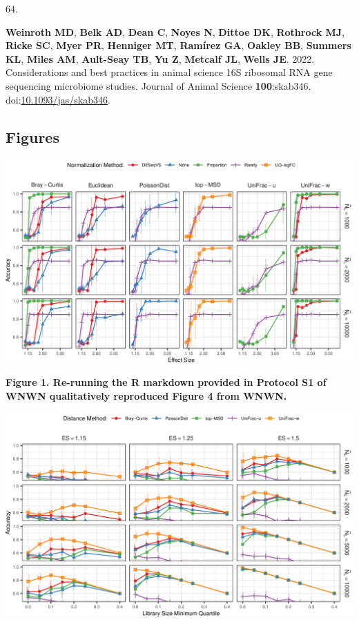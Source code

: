 \documentclass[
]{article}
\newlength{\cslhangindent}
\newlength{\csllabelwidth}
\newlength{\cslentryspacingunit} %
\newenvironment{CSLReferences}[2] %
 {%
  \setlength{\parindent}{0pt}
  \ifodd #1
  \let\oldpar\par
  \def\par{\hangindent=\cslhangindent\oldpar}
  \fi
  \setlength{\parskip}{#2\cslentryspacingunit}
 }%
 {}
\newcommand{\CSLLeftMargin}[1]{\parbox[t]{\csllabelwidth}{#1}}
\newcommand{\CSLRightInline}[1]{\parbox[t]{\linewidth - \csllabelwidth}{#1}\break}
\begin{document}
\begin{CSLReferences}{0}{1}
\leavevmode{}%
\CSLLeftMargin{64. }%
\CSLRightInline{\textbf{Weinroth MD}, \textbf{Belk AD}, \textbf{Dean C},
\textbf{Noyes N}, \textbf{Dittoe DK}, \textbf{Rothrock MJ},
\textbf{Ricke SC}, \textbf{Myer PR}, \textbf{Henniger MT},
\textbf{Ramírez GA}, \textbf{Oakley BB}, \textbf{Summers KL},
\textbf{Miles AM}, \textbf{Ault-Seay TB}, \textbf{Yu Z}, \textbf{Metcalf
JL}, \textbf{Wells JE}. 2022. Considerations and best practices in
animal science 16S ribosomal {RNA} gene sequencing microbiome studies.
Journal of Animal Science \textbf{100}:skab346.
doi:\href{https://doi.org/10.1093/jas/skab346}{10.1093/jas/skab346}.}

\end{CSLReferences}


\setlength{\parindent}{0in}
\setlength{\leftskip}{0in}

\newpage

\hypertarget{figures}{%
\subsection{Figures}\label{figures}}

\includegraphics{figure_01.png}

\textbf{Figure 1. Re-running the R markdown provided in Protocol S1 of
WNWN qualitatively reproduced Figure 4 from WNWN.}

\newpage

\includegraphics{figure_02.png}
\end{document}
